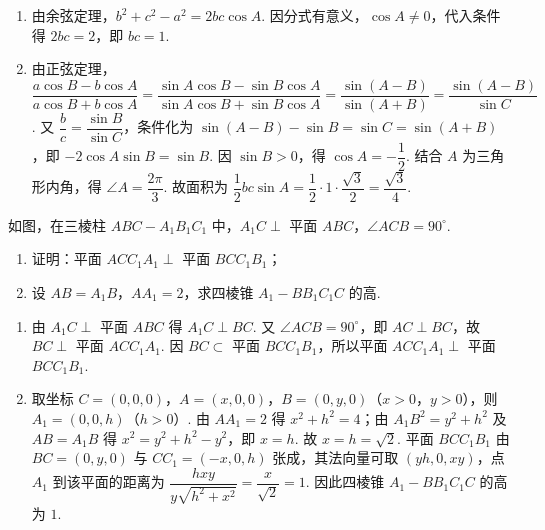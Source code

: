 \begin{solution}
\begin{enumerate}
\item 由余弦定理，\(b^2+c^2-a^2=2bc\cos A\). 因分式有意义，\(\cos A\ne0\)，代入条件得 \(2bc=2\)，即 \(bc=1\).
\item 由正弦定理，\(\dfrac{a\cos B-b\cos A}{a\cos B+b\cos A}=\dfrac{\sin A\cos B-\sin B\cos A}{\sin A\cos B+\sin B\cos A}=\dfrac{\sin(A-B)}{\sin(A+B)}=\dfrac{\sin(A-B)}{\sin C}\). 又 \(\dfrac{b}{c}=\dfrac{\sin B}{\sin C}\)，条件化为 \(\sin(A-B)-\sin B=\sin C=\sin(A+B)\)，即 \(-2\cos A\sin B=\sin B\). 因 \(\sin B>0\)，得 \(\cos A=-\dfrac12\). 结合 \(A\) 为三角形内角，得 \(\angle A=\dfrac{2\pi}{3}\). 故面积为 \(\dfrac12bc\sin A=\dfrac12\cdot1\cdot\dfrac{\sqrt3}{2}=\dfrac{\sqrt3}{4}\).
\end{enumerate}
\end{solution}

\begin{problem}
如图，在三棱柱 \(ABC-A_1B_1C_1\) 中，\(A_1C\perp\) 平面 \(ABC\)，\(\angle ACB=90^\circ\).

\begin{enumerate}
\item 证明：平面 \(ACC_1A_1\perp\) 平面 \(BCC_1B_1\)；
\item 设 \(AB=A_1B\)，\(AA_1=2\)，求四棱锥 \(A_1-BB_1C_1C\) 的高.
\end{enumerate}

\end{problem}

\begin{solution}
\begin{enumerate}
\item 由 \(A_1C\perp\) 平面 \(ABC\) 得 \(A_1C\perp BC\). 又 \(\angle ACB=90^{\circ}\)，即 \(AC\perp BC\)，故 \(BC\perp\) 平面 \(ACC_1A_1\). 因 \(BC\subset\) 平面 \(BCC_1B_1\)，所以平面 \(ACC_1A_1\perp\) 平面 \(BCC_1B_1\).
\item 取坐标 \(C=(0,0,0)\)，\(A=(x,0,0)\)，\(B=(0,y,0)\)（\(x>0\)，\(y>0\)），则 \(A_1=(0,0,h)\)（\(h>0\)）. 由 \(AA_1=2\) 得 \(x^2+h^2=4\)；由 \(A_1B^2=y^2+h^2\) 及 \(AB=A_1B\) 得 \(x^2=y^2+h^2-y^2\)，即 \(x=h\). 故 \(x=h=\sqrt2\). 平面 \(BCC_1B_1\) 由 \(BC=(0,y,0)\) 与 \(CC_1=(-x,0,h)\) 张成，其法向量可取 \((yh,0,xy)\)，点 \(A_1\) 到该平面的距离为 \(\dfrac{hxy}{y\sqrt{h^2+x^2}}=\dfrac{x}{\sqrt2}=1\). 因此四棱锥 \(A_1-BB_1C_1C\) 的高为 \(1\).
\end{enumerate}
\end{solution}

